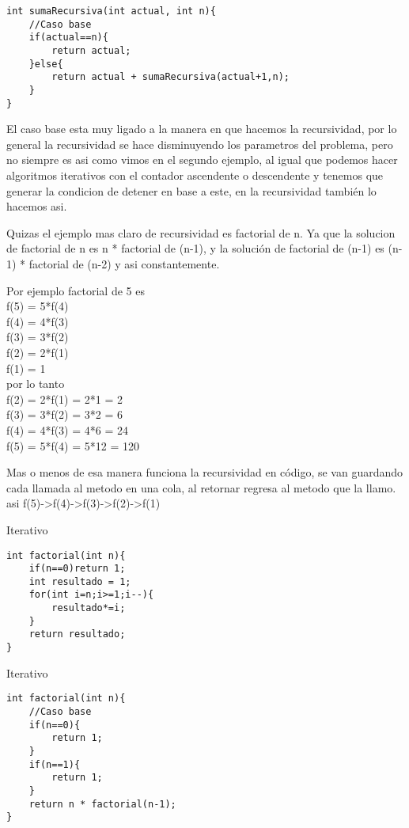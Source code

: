\begin{minipage}{\textwidth}
\begin{lstlisting}[style=C,caption=sumaRecursiva2.cpp]
int sumaRecursiva(int actual, int n){
    //Caso base
    if(actual==n){
        return actual;
    }else{
        return actual + sumaRecursiva(actual+1,n);
    }
}
\end{lstlisting}
\end{minipage}

El caso base esta muy ligado a la manera en que hacemos la recursividad, por lo general la 
recursividad se hace disminuyendo los parametros del problema, pero no siempre es asi como 
vimos en el segundo ejemplo, al igual que podemos hacer algoritmos iterativos con el contador
ascendente o descendente y tenemos que generar la condicion de detener en base a este, en la
recursividad también lo hacemos asi.

Quizas el ejemplo mas claro de recursividad es factorial de n. Ya que la solucion de factorial
de n es n * factorial de (n-1), y la solución de factorial de (n-1) es (n-1) * factorial de (n-2) y
asi constantemente.

Por ejemplo factorial de 5 es
\\f(5) = 5*f(4)
\\f(4) = 4*f(3)
\\f(3) = 3*f(2)
\\f(2) = 2*f(1)
\\f(1) = 1
\\por lo tanto
\\f(2) = 2*f(1) = 2*1 = 2
\\f(3) = 3*f(2) = 3*2 = 6
\\f(4) = 4*f(3) = 4*6 = 24
\\f(5) = 5*f(4) = 5*12 = 120

Mas o menos de esa manera funciona la recursividad en código, se van guardando cada llamada al 
metodo en una cola, al retornar regresa al metodo que la llamo. asi f(5)->f(4)->f(3)->f(2)->f(1)
\begin{minipage}{\textwidth}
Iterativo
\begin{lstlisting}[style=C,caption=factorialIterativo.cpp]
int factorial(int n){
    if(n==0)return 1;
    int resultado = 1;
    for(int i=n;i>=1;i--){
        resultado*=i;
    }
    return resultado;
}
\end{lstlisting}
\end{minipage}

\begin{minipage}{\textwidth}
Iterativo
\begin{lstlisting}[style=C,caption=factorialRecursivo.cpp]
int factorial(int n){
    //Caso base
    if(n==0){
        return 1;
    }
    if(n==1){
        return 1;
    }
    return n * factorial(n-1);
}
\end{lstlisting}
\end{minipage}


